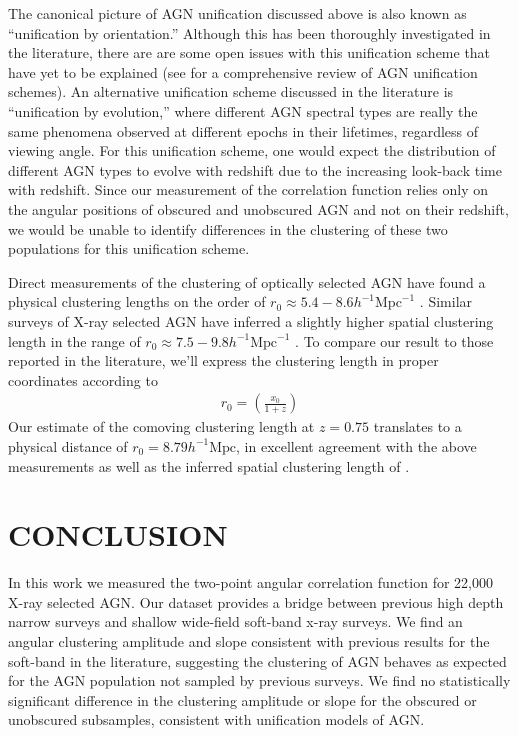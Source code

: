 \documentclass[preprint]{aastex63}
\begin{document}
The canonical picture of AGN unification discussed above is also known as ``unification by orientation.''  Although this has been thoroughly investigated
in the literature, there are are some open issues with this unification scheme that have yet to be explained (see \citet{netzer:2015} for a comprehensive review 
of AGN unification schemes). An alternative unification scheme discussed in the literature is ``unification by evolution,'' where different AGN 
spectral types are really the same phenomena observed at different epochs in their lifetimes, regardless of viewing angle. For this unification scheme, one would 
expect the distribution of different AGN types to evolve with redshift due to the increasing look-back time with redshift. 
Since our measurement of the correlation function relies only
on the angular positions of obscured and unobscured AGN and not on their redshift, we would be unable to identify differences 
in the clustering of these two populations for this unification scheme. 


Direct measurements of the clustering of optically selected AGN have found a physical clustering lengths on the order of $r_0 \approx 5.4 - 8.6 h^{-1} \text{Mpc}^{-1}$ \citep{akylas:2000,croom:2002,grazian:2004}. 
Similar surveys of X-ray selected AGN have inferred a slightly higher spatial clustering length in the range of $r_0 \approx 7.5 - 9.8 h^{-1} \text{Mpc}^{-1}$ \citep{basilakos:2008,miyaji}. To compare our result to 
those reported in the literature, we'll express the clustering length in proper coordinates according to 
\begin{align}
    \label{eq:prop_coord}
    r_0 = \left(\frac{x_0}{1+z}\right)
\end{align}
Our estimate of the comoving clustering length at $z = 0.75$ translates to a physical distance of $r_0 = 8.79 h^{-1} \text{Mpc}$, in excellent agreement with the above measurements 
as well as the inferred spatial clustering length of \citet{ebrero}.
\section{CONCLUSION}

In this work we measured the two-point angular correlation function
for 22,000 X-ray selected AGN. Our dataset provides a bridge 
between previous high depth narrow surveys and
shallow wide-field soft-band x-ray surveys. We find an angular clustering 
amplitude and slope consistent with previous results for the soft-band in the literature, 
suggesting the clustering of AGN behaves as expected for the AGN population not sampled by previous surveys.
We find no statistically significant difference in the clustering amplitude or 
slope for the obscured or unobscured subsamples, consistent with unification models of AGN.
\end{document}
